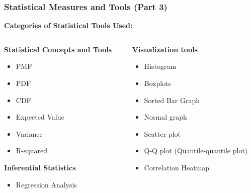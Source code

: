 \begin{frame}
    \frametitle{Statistical Measures and Tools (Part 3)}
    \textbf{Categories of Statistical Tools Used:}
    \begin{columns}
        \begin{column}{0.5\textwidth}
            \textbf{Statistical Concepts and Tools}
            \begin{itemize}
                \item PMF
                \item PDF
                \item CDF
                \item Expected Value
                \item Variance
                \item R-squared
            \end{itemize}
            \vspace{1em}
            \textbf{Inferential Statistics}
            \begin{itemize}
                \item Regression Analysis
            \end{itemize}
        \end{column}
        \begin{column}{0.5\textwidth}
            \textbf{Visualization tools}
            \begin{itemize}
                \item Histogram
                \item Boxplots
                \item Sorted Bar Graph
                \item Normal graph
                \item Scatter plot
                \item Q-Q plot (Quantile-quantile plot)
                \item Correlation Heatmap
            \end{itemize}
        \end{column}
    \end{columns}
\end{frame}